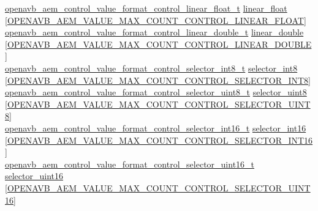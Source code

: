 \begin{DoxyCompactItemize}
\begin{tabbing}
\>\hyperlink{structopenavb__aem__control__value__format__control__linear__float__t}{openavb\_aem\_control\_value\_format\_control\_linear\_float\_t} \hyperlink{structopenavb__aem__descriptor__control__t_af7df7acc1ebdcea78743cb9034d45b4b}{linear\_float} \mbox{[}\hyperlink{openavb__aem__types__pub_8h_aed5cb64f9b113261651036808d6989ff}{OPENAVB\_AEM\_VALUE\_MAX\_COUNT\_CONTROL\_LINEAR\_FLOAT}\mbox{]}\\
\>\hyperlink{structopenavb__aem__control__value__format__control__linear__double__t}{openavb\_aem\_control\_value\_format\_control\_linear\_double\_t} \hyperlink{structopenavb__aem__descriptor__control__t_ab921c09a497f8459f55f0291690ed45f}{linear\_double} \mbox{[}\hyperlink{openavb__aem__types__pub_8h_a272a2e87471f6c68a6b6adce07fb001b}{OPENAVB\_AEM\_VALUE\_MAX\_COUNT\_CONTROL\_LINEAR\_DOUBLE}\mbox{]}\\
\>\hyperlink{structopenavb__aem__control__value__format__control__selector__int8__t}{openavb\_aem\_control\_value\_format\_control\_selector\_int8\_t} \hyperlink{structopenavb__aem__descriptor__control__t_aef05be0a0bd9fadbeac540acf7affedf}{selector\_int8} \mbox{[}\hyperlink{openavb__aem__types__pub_8h_a111815242b895598f3d959e339a07b52}{OPENAVB\_AEM\_VALUE\_MAX\_COUNT\_CONTROL\_SELECTOR\_INT8}\mbox{]}\\
\>\hyperlink{structopenavb__aem__control__value__format__control__selector__uint8__t}{openavb\_aem\_control\_value\_format\_control\_selector\_uint8\_t} \hyperlink{structopenavb__aem__descriptor__control__t_addef12842072a6ba7976eae36933bd95}{selector\_uint8} \mbox{[}\hyperlink{openavb__aem__types__pub_8h_af579b10c05b828986274ca1d455d5e9d}{OPENAVB\_AEM\_VALUE\_MAX\_COUNT\_CONTROL\_SELECTOR\_UINT8}\mbox{]}\\
\>\hyperlink{structopenavb__aem__control__value__format__control__selector__int16__t}{openavb\_aem\_control\_value\_format\_control\_selector\_int16\_t} \hyperlink{structopenavb__aem__descriptor__control__t_a36b1e6cfd613e50cc58063996008da0d}{selector\_int16} \mbox{[}\hyperlink{openavb__aem__types__pub_8h_a3dc3f9647be26cc6037b8ce205eab0b6}{OPENAVB\_AEM\_VALUE\_MAX\_COUNT\_CONTROL\_SELECTOR\_INT16}\mbox{]}\\
\>\hyperlink{structopenavb__aem__control__value__format__control__selector__uint16__t}{openavb\_aem\_control\_value\_format\_control\_selector\_uint16\_t} \hyperlink{structopenavb__aem__descriptor__control__t_aa7f0da4052188a9cc141822c75d47ca4}{selector\_uint16} \mbox{[}\hyperlink{openavb__aem__types__pub_8h_a801e85bb448ba839dd8e623eed7880a1}{OPENAVB\_AEM\_VALUE\_MAX\_COUNT\_CONTROL\_SELECTOR\_UINT16}\mbox{]}\\

\end{tabbing}
\end{DoxyCompactItemize}
